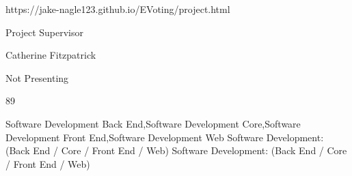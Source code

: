 {https://jake-nagle123.github.io/EVoting/project.html}

{Project Supervisor}

{}

{Catherine Fitzpatrick}

{Not Presenting}

{89}

{Software Development Back End,Software Development Core,Software Development Front End,Software Development Web}
{Software Development: (Back End / Core / Front End / Web)}
{Software Development: (Back End / Core / Front End / Web)}

\endgroup

\DefaultLayout
